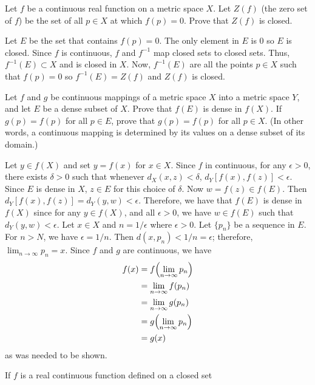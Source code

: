 \begin{exercise}
\item
  Let \(f\) be a continuous real function on a metric space \(X\).
  Let \(Z(f)\) (the zero set of \(f\)) be the set of all \(p\in X\) at which
  \(f(p) = 0\).
  Prove that \(Z(f)\) is closed.
  \par\smallskip
  Let \(E\) be the set that contains \(f(p) = 0\).
  The only element in \(E\) is \(0\) so \(E\) is closed.
  Since \(f\) is continuous, \(f\) and \(f^{-1}\) map closed sets to closed
  sets.
  Thus, \(f^{-1}(E)\subset X\) and is closed in \(X\).
  Now, \(f^{-1}(E)\) are all the points \(p\in X\) such that \(f(p) = 0\) so
  \(f^{-1}(E) = Z(f)\) and \(Z(f)\) is closed.
\item
  \label{4.4}
  Let \(f\) and \(g\) be continuous mappings of a metric space \(X\) into a
  metric space \(Y\), and let \(E\) be a dense subset of \(X\).
  Prove that \(f(E)\) is dense in \(f(X)\).
  If \(g(p) = f(p)\) for all \(p\in E\), prove that \(g(p) = f(p)\) for all
  \(p\in X\).
  (In other words, a continuous mapping is determined by its values on a dense
  subset of its domain.)
  \par\smallskip
  Let \(y\in f(X)\) and set \(y = f(x)\) for \(x\in X\).
  Since \(f\) in continuous, for any \(\epsilon > 0\), there exists
  \(\delta > 0\) such that whenever \(d_X(x,z) < \delta\),
  \(d_Y[f(x),f(z)] < \epsilon\).
  Since \(E\) is dense in \(X\), \(z\in E\) for this choice of \(\delta\).
  Now \(w = f(z)\in f(E)\).
  Then \(d_Y[f(x),f(z)] = d_Y(y,w) < \epsilon\).
  Therefore, we have that \(f(E)\) is dense in \(f(X)\) since for any
  \(y\in f(X)\), and all \(\epsilon > 0\), we have \(w\in f(E)\) such that
  \(d_Y(y,w) < \epsilon\).
  Let \(x\in X\) and \(n = 1/\epsilon\) where \(\epsilon > 0\).
  Let \(\{p_n\}\) be a sequence in \(E\).
  For \(n > N\), we have \(\epsilon = 1/n\).
  Then \(d(x,p_n) < 1/n = \epsilon\); therefore, \(\lim_{n\to\infty}p_n = x\).
  Since \(f\) and \(g\) are continuous, we have
  \begin{align*}
    f(x) & = f\Bigl(\lim_{n\to\infty}p_n\Bigr)\\
         & = \lim_{n\to\infty}f(p_n)\\
         & = \lim_{n\to\infty}g(p_n)\\
         & = g\Bigl(\lim_{n\to\infty}p_n\Bigr)\\
         & = g(x)
  \end{align*}
  as was needed to be shown.
\item
  \label{4.5}
  If \(f\) is a real continuous function defined on a closed set

\end{exercise}
